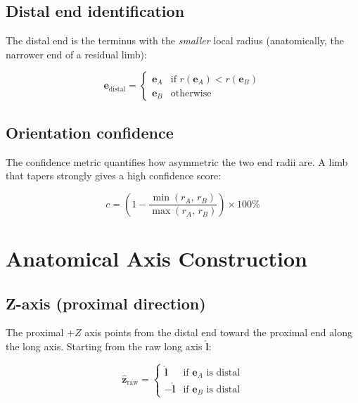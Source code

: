 \documentclass[11pt, a4paper]{article}
\begin{document}
\subsection{Distal end identification}

The distal end is the terminus with the \emph{smaller} local radius (anatomically,
the narrower end of a residual limb):

\begin{equation}
  \bm{e}_{\mathrm{distal}} =
  \begin{cases}
    \bm{e}_A & \text{if } r(\bm{e}_A) < r(\bm{e}_B) \\
    \bm{e}_B & \text{otherwise}
  \end{cases}
\end{equation}

\subsection{Orientation confidence}

The confidence metric quantifies how asymmetric the two end radii are.  A
limb that tapers strongly gives a high confidence score:

\begin{equation}
  c = \left(1 - \frac{\min(r_A,\, r_B)}{\max(r_A,\, r_B)}\right) \times 100\%
\end{equation}

\section{Anatomical Axis Construction}

\subsection{Z-axis (proximal direction)}

The proximal $+Z$ axis points from the distal end toward the proximal end along
the long axis.  Starting from the raw long axis $\hat{\bm{l}}$:

\begin{equation}
  \hat{\bm{z}}_{\mathrm{raw}} =
  \begin{cases}
    \hat{\bm{l}}  & \text{if } \bm{e}_A \text{ is distal} \\
    -\hat{\bm{l}} & \text{if } \bm{e}_B \text{ is distal}
  \end{cases}
\end{equation}
\end{document}
